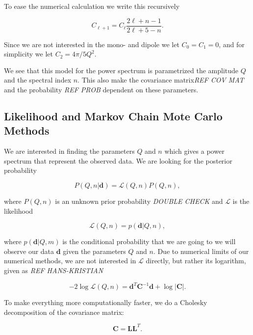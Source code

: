 \documentclass{emulateapj}
\begin{document}
To ease the numerical calculation we write this recursively

\begin{equation}
C_{\ell + 1} = C_\ell \frac{2\ell + n -1}{2\ell + 5 - n}.
\end{equation}

Since we are not interested in the mono- and dipole we let $C_0 = C_1 = 0$, and for simplicity we let $C_2 = 4\pi/5Q^2$.

We see that this model for the power spectrum is parametrized the amplitude $Q$ and the spectral index $n$. This also make the covariance matrix\emph{REF COV MAT} and the probability \emph{REF PROB} dependent on these parameters.

\subsection{Likelihood and Markov Chain Mote Carlo Methods}
We are interested in finding the parameters $Q$ and $n$ which gives a power spectrum that represent the observed data. We are looking for the posterior probability

\begin{equation}
P(Q,n|\mathbf{d}) = \mathcal{L}(Q,n)P(Q,n),
\end{equation}

where $P(Q,n)$ is an unknown prior probability \emph{DOUBLE CHECK} and $\mathcal{L}$ is the likelihood

\begin{equation}
\mathcal{L}(Q,n) = p(\mathbf{d}|Q,n),
\end{equation}

where $p(\mathbf{d}|Q,m)$ is the conditional probability that we are going to we will observe our data $\mathbf{d}$ given the parameters $Q$ and $n$. Due to numerical limits of our numerical methods, we are not interested in $\mathcal{L}$ directly, but rather its logarithm, given as \emph{REF HANS-KRISTIAN}

\begin{equation}
-2\log \mathcal{L}(Q,n) =  \mathbf{d}^T\mathbf{C}^{-1}\mathbf{d} + \log|\mathbf{C}|.
\end{equation}

To make everything more computationally faster, we do a Cholesky decomposition of the covariance matrix:

\begin{equation}
\mathbf{C} = \mathbf{L}\mathbf{L}^T.
\end{equation} 
 
\end{document}
